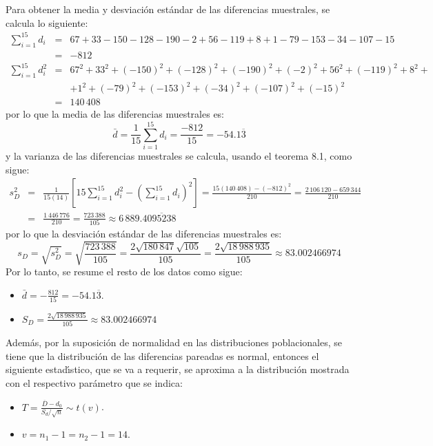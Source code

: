 \begin{solucion}
\begin{datos}
\begin{center}
  \end{center}
  Para obtener la media y desviaci\'on est\'andar 
  de las diferencias muestrales, se calcula lo siguiente:
  \begin{eqnarray*}
   \sum_{i=1}^{15} d_{i} & = &
   67 + 33 -150 -128 -190 -2 +56 -119 + 8 + 1 -79 -153 -34 -107 -15
   \\
   & = & -812 \\
   \sum_{i=1}^{15} d_{i}^2 & = &
   67^2 + 33^2 + (-150)^2 + (-128)^2 + (-190)^2 + (-2)^2 + 56^2
   + (-119)^2 + 8^2 + \\
   & & + 1^2 + (-79)^2 + (-153)^2 + (-34)^2 + (-107)^2 + (-15)^2
   \\
   & = & 140\,408
  \end{eqnarray*}
  por lo que la media de las diferencias muestrales es:
  \begin{equation*}
   \bar{d} = \frac{1}{15} \sum_{i=1}^{15} d_i
   = \frac{-812}{15} = -54.1\overline{3}
  \end{equation*}
  y la varianza de las diferencias muestrales se calcula,
  usando el teorema 8.1, como sigue:
  \begin{eqnarray*}
   s_D^2 & = & \frac{1}{15(14)} \left[
   15 \sum_{i=1}^{15} d_i^2 - \left( \sum_{i=1}^{15} d_i \right)^2
   \right]
   = \frac{15(140\,408) - (-812)^2}{210}
   = \frac{2\,106\,120 - 659\,344}{210} \\
   & = & \frac{1\,446\,776}{210} = \frac{723\,388}{105}
   \approx 6\,889.4\overline{095238}
  \end{eqnarray*}
  por lo que la desviaci\'on est\'andar de las diferencias
  muestrales es:
  \begin{equation*}
   s_D = \sqrt{s_D^2} = \sqrt{\frac{723\,388}{105}}
   = \frac{2\sqrt{180\,847}\sqrt{105}}{105}
   = \frac{2\sqrt{18\,988\,935}}{105}
   \approx 83.002466974
  \end{equation*}
  Por lo tanto, se resume el resto de los datos como sigue:
  \begin{itemize}
   \item $\bar{d} = -\frac{812}{15} = -54.1\overline{3}$.
   \item $S_D = \frac{2\sqrt{18\,988\,935}}{105}
   \approx 83.002466974$
  \end{itemize}
  Adem\'as, por la suposici\'on de normalidad
  en las distribuciones poblacionales,
  se tiene que la distribuci\'on de las diferencias pareadas
  es normal,
  entonces el siguiente estad\'{\i}stico, que se va a requerir,
  se aproxima a la distribuci\'on mostrada
  con el respectivo par\'ametro que se indica:
  \begin{itemize}
   \item $T = \frac{\overline{D} - d_0}{S_d/\sqrt{n}} \sim t(v)$.
   \item $v = n_1 - 1 = n_2 - 1 = 14$.
  \end{itemize}
 \end{datos}


\end{solucion}
